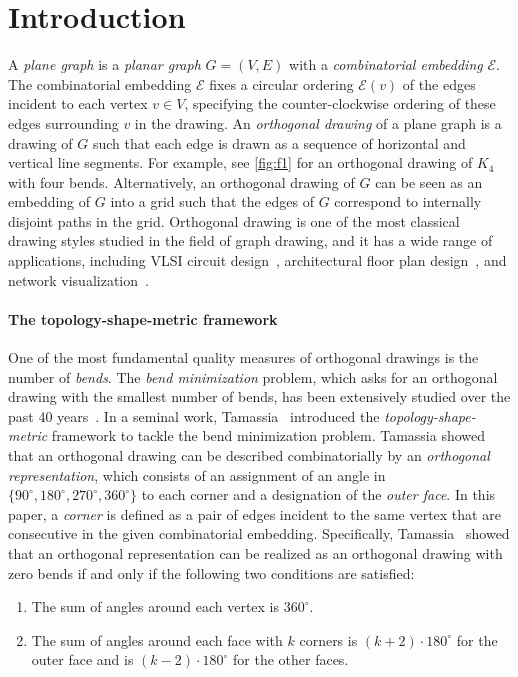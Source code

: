 \documentclass{article}\usepackage[a4paper,margin=20mm]{geometry}
\newcommand{\EE}{\mathcal{E}}
\begin{document}

\section{Introduction}\label{sect:intro}

A \emph{plane graph} is a \emph{planar graph} $G=(V,E)$ with a \emph{combinatorial embedding} $\EE$. The combinatorial embedding $\EE$ fixes a circular ordering $\EE(v)$ of the edges incident to each vertex $v \in V$, specifying the counter-clockwise ordering of these edges surrounding $v$ in the drawing.
An \emph{orthogonal drawing} of a plane graph is a drawing of $G$ such that each edge is drawn as a sequence of horizontal and vertical line segments. For example, see \cref{fig:f1} for an orthogonal drawing of $K_4$ with four bends. Alternatively, an orthogonal drawing of $G$ can be seen as an embedding of $G$ into a grid such that the edges of $G$ correspond to internally disjoint paths in the grid.
Orthogonal drawing is one of the most classical drawing styles studied in the field of graph drawing, and it has a wide range of applications, including VLSI circuit design~\cite{bhatt1984framework,valiant1981universality}, architectural floor plan design~\cite{LIGGETT1981277}, and network visualization~\cite{batini1986layout,eiglsperger2004automatic,gutwenger2003new,kieffer2015hola}.

\paragraph{The topology-shape-metric framework}
One of the most fundamental quality measures of orthogonal drawings is the number of \emph{bends}.
The \emph{bend minimization} problem, which asks for an orthogonal drawing with the smallest number of bends, has been extensively studied over the past 40 years~\cite{CK12,BLV98,didimo2020optimal,GT96,storer1980node,tamassia1987embedding}.
In a seminal work, Tamassia~\cite{tamassia1987embedding} introduced the \emph{topology-shape-metric} framework to tackle the bend minimization problem.  Tamassia showed that an orthogonal drawing can be described combinatorially by an \emph{orthogonal representation}, which consists of an assignment of an angle in $\{90^\circ, 180^\circ, 270^\circ, 360^\circ\}$ to each corner and a designation of the \emph{outer face}. In this paper, a \emph{corner} is defined as a pair of edges incident to the same vertex that are consecutive in the given combinatorial embedding. Specifically, Tamassia~\cite{tamassia1987embedding} showed that an orthogonal representation can be realized as an orthogonal drawing with zero bends if and only if the following two conditions are satisfied:
\begin{enumerate}[(O1)]
    \item \label{item:O1} The sum of angles around each vertex is $360^\circ$.
    \item \label{item:O2} The sum of angles around each face with $k$ corners is $(k+2)\cdot 180^\circ$ for the outer face and is $(k-2)\cdot 180^\circ$ for the other faces.
\end{enumerate}
\end{document}
